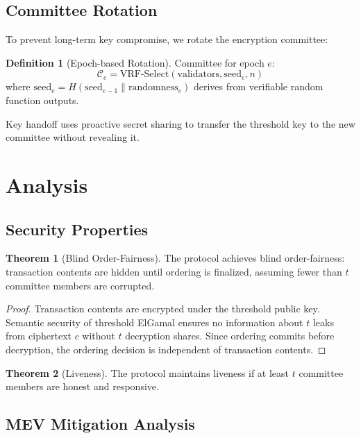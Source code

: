 \documentclass[11pt,a4paper]{article}
\theoremstyle{definition}
\newtheorem{definition}{Definition}
\newtheorem{theorem}{Theorem}
\begin{document}
\subsection{Committee Rotation}

To prevent long-term key compromise, we rotate the encryption committee:

\begin{definition}[Epoch-based Rotation]
Committee for epoch $e$:
\[
\mathcal{C}_e = \text{VRF-Select}(\text{validators}, \text{seed}_e, n)
\]
where $\text{seed}_e = H(\text{seed}_{e-1} \| \text{randomness}_e)$ derives from verifiable random function outputs.
\end{definition}

Key handoff uses proactive secret sharing to transfer the threshold key to the new committee without revealing it.

\section{Analysis}

\subsection{Security Properties}

\begin{theorem}[Blind Order-Fairness]
The protocol achieves blind order-fairness: transaction contents are hidden until ordering is finalized, assuming fewer than $t$ committee members are corrupted.
\end{theorem}

\begin{proof}
Transaction contents are encrypted under the threshold public key. Semantic security of threshold ElGamal ensures no information about $t$ leaks from ciphertext $c$ without $t$ decryption shares. Since ordering commits before decryption, the ordering decision is independent of transaction contents.
\end{proof}

\begin{theorem}[Liveness]
The protocol maintains liveness if at least $t$ committee members are honest and responsive.
\end{theorem}

\subsection{MEV Mitigation Analysis}
\end{document}
